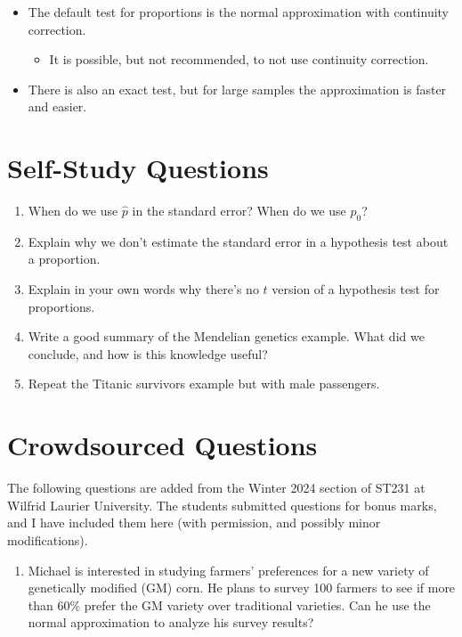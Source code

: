 \documentclass[
  letterpaper,
  DIV=11,
  numbers=noendperiod,
  oneside]{scrreprt}
\providecommand{\tightlist}{%
  \setlength{\itemsep}{0pt}\setlength{\parskip}{0pt}}\usepackage{longtable,booktabs,array}
\begin{document}
\begin{itemize}
\tightlist
\item
  The default test for proportions is the normal approximation with
  continuity correction.

  \begin{itemize}
  \tightlist
  \item
    It is possible, but not recommended, to not use continuity
    correction.
  \end{itemize}
\item
  There is also an exact test, but for large samples the approximation
  is faster and easier.
\end{itemize}

\hypertarget{self-study-questions-8}{%
\section{Self-Study Questions}\label{self-study-questions-8}}

\begin{enumerate}
\def\labelenumi{\arabic{enumi}.}
\tightlist
\item
  When do we use \(\hat p\) in the standard error? When do we use
  \(p_0\)?
\item
  Explain why we don't estimate the standard error in a hypothesis test
  about a proportion.
\item
  Explain in your own words why there's no \(t\) version of a hypothesis
  test for proportions.
\item
  Write a good summary of the Mendelian genetics example. What did we
  conclude, and how is this knowledge useful?
\item
  Repeat the Titanic survivors example but with male passengers.
\end{enumerate}

\hypertarget{crowdsourced-questions-11}{%
\section{Crowdsourced Questions}\label{crowdsourced-questions-11}}

The following questions are added from the Winter 2024 section of ST231
at Wilfrid Laurier University. The students submitted questions for
bonus marks, and I have included them here (with permission, and
possibly minor modifications).

\begin{enumerate}
\def\labelenumi{\arabic{enumi}.}
\tightlist
\item
  Michael is interested in studying farmers' preferences for a new
  variety of genetically modified (GM) corn. He plans to survey 100
  farmers to see if more than 60\% prefer the GM variety over
  traditional varieties. Can he use the normal approximation to analyze
  his survey results?
\end{enumerate}
\end{document}
